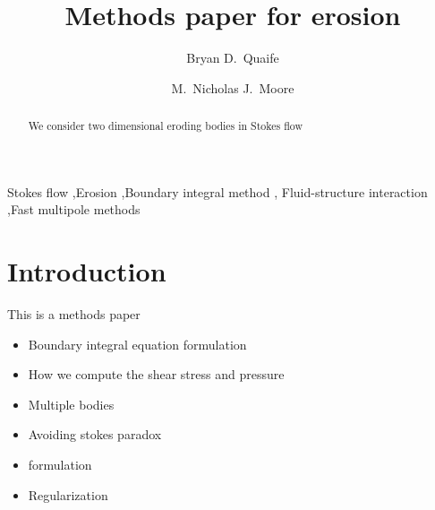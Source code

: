 \documentclass[preprint, 10pt]{elsarticle}
\begin{document}
\title{Methods paper for erosion}

\author[Bryan]{Bryan D.~Quaife}
\author[Nick]{M.~Nicholas J.~Moore}
\address[Nick]{Department of Mathematics and Geophysical Fluid Dynamics Institute, Florida State University, Tallahassee, FL, 32306.}
\address[Bryan]{Department of Scientific Computing and Geophysical Fluid Dynamics Institute, Florida State University, Tallahassee, FL, 32306.}

\begin{abstract} 
We consider two dimensional eroding bodies in Stokes flow
\end{abstract}

\begin{keyword}
  Stokes flow \sep Erosion \sep Boundary integral method \sep
  Fluid-structure interaction \sep Fast multipole methods 
\end{keyword}

\maketitle

\section{Introduction\label{s:intro}}

This is a methods paper
\begin{itemize}
  \item Boundary integral equation formulation
  \item How we compute the shear stress and pressure
  \item Multiple bodies
  \item Avoiding stokes paradox
  \item {\thL} formulation
  \item Regularization
\end{itemize}
\end{document}
